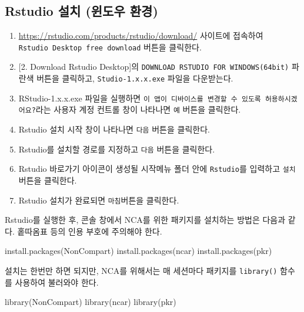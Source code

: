 \documentclass[
  11pt,
  krantz2, a4paper, twoside]{krantz}
\newenvironment{Shaded}{\begin{snugshade}}{\end{snugshade}}
\newcommand{\FunctionTok}[1]{\textcolor[rgb]{0.00,0.00,0.00}{#1}}
\newcommand{\NormalTok}[1]{#1}
\newcommand{\StringTok}[1]{\textcolor[rgb]{0.31,0.60,0.02}{#1}}
\providecommand{\tightlist}{%
  \setlength{\itemsep}{0pt}\setlength{\parskip}{0pt}}
\theoremstyle{definition}
\theoremstyle{definition}
\theoremstyle{definition}
\theoremstyle{definition}
\theoremstyle{remark}
\begin{document}
\hypertarget{rstudio-uxc124uxce58-uxc708uxb3c4uxc6b0-uxd658uxacbd}{%
\subsection{Rstudio 설치 (윈도우 환경)}\label{rstudio-uxc124uxce58-uxc708uxb3c4uxc6b0-uxd658uxacbd}}

\begin{enumerate}
\def\labelenumi{\arabic{enumi}.}
\tightlist
\item
  \url{https://rstudio.com/products/rstudio/download/} 사이트에 접속하여 \texttt{Rstudio\ Desktop\ free\ download} 버튼을 클릭한다.
\item
  {[}2. Download Rstudio Desktop{]}의 \texttt{DOWNLOAD\ RSTUDIO\ FOR\ WINDOWS(64bit)} 파란색 버튼을 클릭하고, \texttt{Studio-1.x.x.exe} 파일을 다운받는다.
\item
  RStudio-1.x.x.exe 파일을 실행하면 \texttt{이\ 앱이\ 디바이스를\ 변경할\ 수\ 있도록\ 허용하시겠어요?}라는 사용자 계정 컨트롤 창이 나타나면 \texttt{예} 버튼을 클릭한다.
\item
  Rstudio 설치 시작 창이 나타나면 \texttt{다음} 버튼을 클릭한다.
\item
  Rstudio를 설치할 경로를 지정하고 \texttt{다음} 버튼을 클릭한다.
\item
  Rstudio 바로가기 아이콘이 생성될 시작메뉴 폴더 안에 \texttt{Rstudio}를 입력하고 \texttt{설치} 버튼을 클릭한다.
\item
  Rstudio 설치가 완료되면 \texttt{마침}버튼을 클릭한다.
\end{enumerate}

Rstudio를 실행한 후, 콘솔 창에서 NCA를 위한 패키지를 설치하는 방법은 다음과 같다. 홑따옴표 등의 인용 부호에 주의해야 한다.

\begin{Shaded}
\begin{Highlighting}[]
\FunctionTok{install.packages}\NormalTok{(}\StringTok{\textquotesingle{}NonCompart\textquotesingle{}}\NormalTok{)}
\FunctionTok{install.packages}\NormalTok{(}\StringTok{\textquotesingle{}ncar\textquotesingle{}}\NormalTok{)}
\FunctionTok{install.packages}\NormalTok{(}\StringTok{\textquotesingle{}pkr\textquotesingle{}}\NormalTok{)}
\end{Highlighting}
\end{Shaded}

설치는 한번만 하면 되지만, NCA를 위해서는 매 세션마다 패키지를 \texttt{library()} 함수를 사용하여 불러와야 한다.

\begin{Shaded}
\begin{Highlighting}[]
\FunctionTok{library}\NormalTok{(NonCompart)}
\FunctionTok{library}\NormalTok{(ncar)}
\FunctionTok{library}\NormalTok{(pkr)}
\end{Highlighting}
\end{Shaded}
\end{document}

